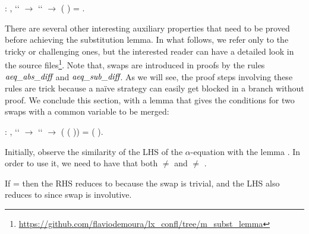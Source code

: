 \begin{coqdoccode}
\coqdocemptyline
\coqdocnoindent
{} : \coqdockw{\ensuremath{\forall}}   ,  ``   \ensuremath{\rightarrow}  ``   \ensuremath{\rightarrow} (   ) =  .\coqdoceol
 \coqdocemptyline
\coqdocemptyline
\end{coqdoccode}
There are several other interesting auxiliary properties that need to be proved before achieving the substitution lemma. In what follows, we refer only to the tricky or challenging ones, but the interested reader can have a detailed look in the source files\footnote{\url{https://github.com/flaviodemoura/lx_confl/tree/m_subst_lemma}}. Note that, swaps are introduced in proofs by the rules $\mbox{\it aeq}\_\mbox{\it abs}\_\mbox{\it diff}$ and $\mbox{\it aeq}\_\mbox{\it sub}\_\mbox{\it diff}$. As we will see, the proof steps involving these rules are trick because a naïve strategy can easily get blocked in a branch without proof. We conclude this section, with a lemma that gives the conditions for two swaps with a common variable to be merged: 
\begin{coqdoccode}
\coqdocemptyline
\coqdocnoindent
{} : \coqdockw{\ensuremath{\forall}}    ,  ``   \ensuremath{\rightarrow}  ``   \ensuremath{\rightarrow} (   (   )) = (   ).\coqdoceol
\end{coqdoccode}
 Initially, observe the similarity of the LHS of the $\alpha$-equation with the lemma . In order to use it, we need to have that both  \ensuremath{\not=}  and  \ensuremath{\not=} . 
\begin{coqdoccode}
\end{coqdoccode}
If  =  then the RHS reduces to  because the swap is trivial, and the LHS also reduces to  since swap is involutive.
\begin{coqdoccode}
\end{coqdoccode}
